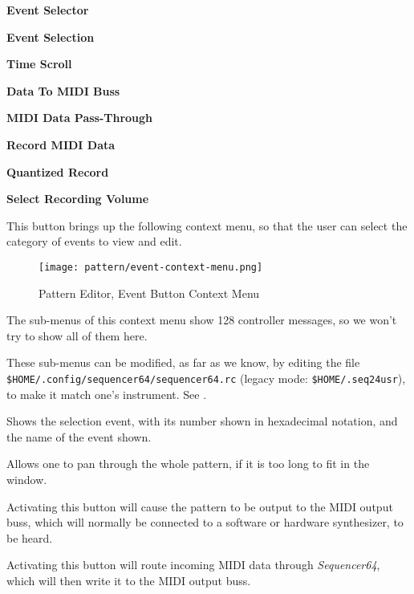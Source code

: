    \begin{enumber}
      \item \textbf{Event Selector}
      \item \textbf{Event Selection}
      \item \textbf{Time Scroll}
      \item \textbf{Data To MIDI Buss}
      \item \textbf{MIDI Data Pass-Through}
      \item \textbf{Record MIDI Data}
      \item \textbf{Quantized Record}
      \item \textbf{Select Recording Volume}
   \end{enumber}

   \setcounter{ItemCounter}{0}      %

   This button brings up the following context menu, so that the user can
   select the category of events to view and edit.

\begin{figure}[H]
   \centering 
   \texttt{[image: pattern/event-context-menu.png]}
   \caption{Pattern Editor, Event Button Context Menu}
   \label{fig:pattern_editor_bottom_event_context_menu}
\end{figure}

   The sub-menus of this context menu show 128 controller messages,
   so we won't try to show all of them here.

   These sub-menus can be modified, as far as we know, by editing
   the file \texttt{\$HOME/.config/sequencer64/sequencer64.rc}
   (legacy mode: \texttt{\$HOME/.seq24usr}), to make it match one's
   instrument.  See .

   Shows the selection event, with its number shown in hexadecimal notation,
   and the name of the event shown.

   Allows one to pan through the whole pattern, if it is too long to fit in
   the window.

   Activating this button will cause the pattern to be output to the MIDI
   output buss, which will normally be connected to a software or hardware
   synthesizer, to be heard.

   Activating this button will route incoming MIDI data through
   \textsl{Sequencer64}, which will then write it to the MIDI output buss.


